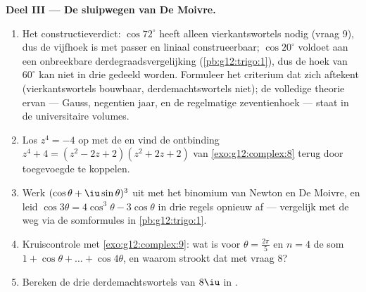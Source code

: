 \begin{problem}
\medskip
\noindent\textbf{Deel III --- De sluipwegen van De Moivre.}
\begin{enumerate}[resume]
  \item Het constructieverdict: $\cos 72^\circ$ heeft alleen
        vierkantswortels nodig (vraag 9), dus de vijfhoek is met passer en
        liniaal construeerbaar; $\cos 20^\circ$ voldoet aan een onbreekbare
        derdegraadsvergelijking (\cref{pb:g12:trigo:1}), dus de hoek van
        $60^\circ$ kan niet in drie gedeeld worden. Formuleer het criterium
        dat zich aftekent (vierkantswortels bouwbaar, derdemachtswortels
        niet); de volledige theorie ervan --- Gauss, negentien jaar, en de
        regelmatige zeventienhoek --- staat in de universitaire volumes.
  \item Los $z^4 = -4$ op met de  en vind de ontbinding
        $z^4 + 4 = (z^2 - 2z + 2)(z^2 + 2z + 2)$ van
        \cref{exo:g12:complex:8} terug door toegevoegde  te koppelen.
  \item Werk $(\cos\theta + \iu\sin\theta)^3$ uit met het binomium van Newton
        en De Moivre, en leid $\cos 3\theta = 4\cos^3\theta - 3\cos\theta$ in
        drie regels opnieuw af --- vergelijk met de weg via de somformules in
        \cref{pb:g12:trigo:1}.
  \item Kruiscontrole met \cref{exo:g12:complex:9}: wat is voor
        $\theta = \frac{2\pi}{5}$ en $n = 4$ de som
        $1 + \cos\theta + \dots + \cos 4\theta$, en waarom strookt dat met
        vraag 8?
  \item Bereken de drie derdemachtswortels van $8\iu$ in .
\end{enumerate}


\end{problem}

